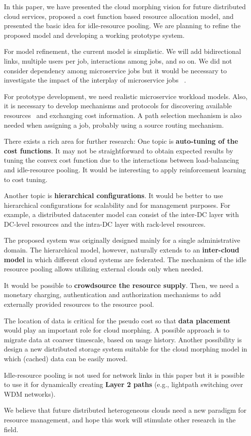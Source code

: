
In this paper, we have presented the cloud morphing vision for
future distributed cloud services,
proposed a cost function based resource allocation model,
and presented the basic idea for idle-resource pooling.
We are planning to refine the proposed model and developing a working
prototype system.

For model refinement,
the current model is simplistic. We will add bidirectional links,
multiple users per job, interactions among jobs, and so on.
We did not consider dependency among microservice jobs but it would be
necessary to investigate the impact of the interplay of microservice
jobs ~\cite{Suresh-SOA-SOCC2017}.

For prototype development,
we need realistic microservice workload models.
Also, it is necessary to develop mechanisms and protocols for
discovering available resources~\cite{Albrecht2008} and exchanging
cost information.
A path selection mechanism is also needed when assigning a job,
probably using a source routing mechanism.

There exists a rich area for further research:
One topic is {\bf auto-tuning of the cost functions}.
It may not be straightforward to obtain expected results by tuning the
convex cost function due to the interactions between load-balancing
and idle-resource pooling.
It would be interesting to apply reinforcement learning to cost
tuning.

Another topic is {\bf hierarchical configurations}.
It would be better to use hierarchical configurations for scalability
and for management purposes.
For example, a distributed datacenter model can consist of
the inter-DC layer with DC-level resources and the intra-DC layer
with rack-level resources.

The proposed system was originally designed mainly for a single
administrative domain.
The hierarchical model, however, naturally extends to
an {\bf inter-cloud model} in which different cloud systems are
federated.
The mechanism of the idle resource pooling allows utilizing external
clouds only when needed.

It would be possible to {\bf crowdsource the resource supply}. 
Then, we need a monetary charging, authentication and authorization
mechanisms to add externally provided resources to the resource pool.

The location of data is critical for the pseudo cost so that
{\bf data placement} would play an important role for cloud morphing. 
A possible approach is to migrate data at coarser timescale, based
on usage history.
Another possibility is design a new distributed storage system
suitable for the cloud morphing model in which (cached) data can be
easily moved.

Idle-resource pooling is not used for network links in this paper but
it is possible to use it for dynamically creating {\bf Layer 2 paths}
(e.g., lightpath switching over WDM networks).

We believe that future distributed heterogeneous clouds need a new
paradigm for resource management, and hope this work will stimulate
other research in the field.
